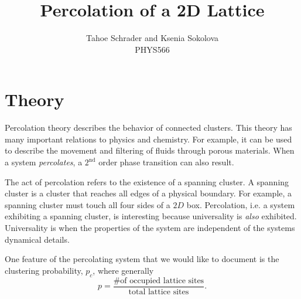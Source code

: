 \documentclass[12pt]{article}
\title{Percolation of a 2D Lattice}
\author{Tahoe Schrader and Ksenia Sokolova \\PHYS566}
\date{}
\begin{document}
\maketitle



\section{Theory}
\label{sec:theory}
Percolation theory describes the behavior of connected clusters. This theory has many important relations to physics and chemistry. For example, it can be used to describe the movement and filtering of fluids through porous materials. When a system \emph{percolates}, a $2^\text{nd}$ order phase transition can also result.

The act of percolation refers to the existence of a spanning cluster. A spanning cluster is a cluster that reaches all edges of a physical boundary. For example, a spanning cluster must touch all four sides of a $2D$ box. Percolation, i.e. a system exhibiting a spanning cluster, is interesting because universality is \emph{also} exhibited. Universality is when the properties of the system are independent of the systems dynamical details.

One feature of the percolating system that we would like to document is the clustering probability, $p_c$, where generally
\begin{equation}
  \label{eq:probability}
  p = \frac{\text{\# of occupied lattice sites}}{\text{total lattice sites}}.
\end{equation}
\end{document}
